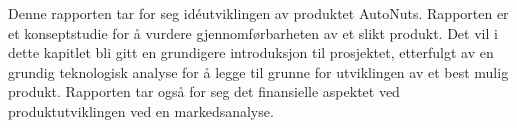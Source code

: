 Denne rapporten tar for seg idéutviklingen av produktet AutoNuts. Rapporten er 
et konseptstudie for å vurdere gjennomførbarheten av et slikt produkt. Det vil 
i dette kapitlet bli gitt en grundigere introduksjon til prosjektet, etterfulgt 
av en grundig teknologisk analyse for å legge til grunne for utviklingen 
av et best mulig produkt. Rapporten tar også for seg det finansielle aspektet ved 
produktutviklingen ved en markedsanalyse.

